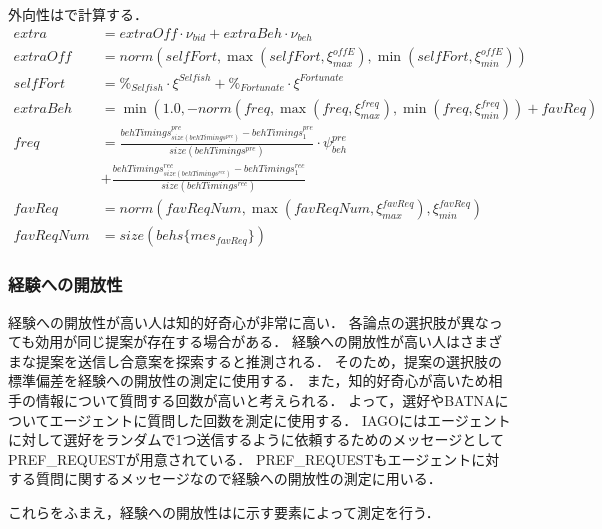 外向性はで計算する．
\begin{align}
    extra &= \mathit{extraOff} \cdot \nu_{\mathit{bid}} + extraBeh \cdot \nu_{beh} \label{eq:extraversion} \\
    \mathit{extraOff} &= norm\left( \mathit{selfFort}, \max \left( \mathit{selfFort}, \xi_{max}^{\mathit{offE}}\right) , \min \left( \mathit{selfFort}, \xi_{min}^{\mathit{offE}}\right) \right) \nonumber \\
    \mathit{selfFort} &= \%_{\mathit{Selfish}} \cdot \xi^{\mathit{Selfish}} + \%_{Fortunate} \cdot \xi^{\mathit{Fortunate}} \nonumber \\
    extraBeh &= \min \left( 1.0, -norm\left( \mathit{freq}, \max \left( \mathit{freq}, \xi_{max}^{\mathit{freq}}\right), \min\left( \mathit{freq}, \xi_{min}^{\mathit{freq}}\right) \right) + \mathit{favReq}\right) \nonumber \\
    \mathit{freq} &= \frac{behTimings^{pre}_{size(behTimings^{pre})} - behTimings^{pre}_1}{size(behTimings^{pre})} \cdot \psi_{\mathit{beh}}^{pre} \nonumber \\
    &+ \frac{behTimings^{rec}_{size(behTimings^{rec})} - behTimings^{rec}_1}{size(behTimings^{rec})} \nonumber \\
    \mathit{favReq} &= norm\left( \mathit{favReqNum}, \max \left( \mathit{favReqNum}, \xi_{max}^{\mathit{favReq}}\right), \xi_{min}^{\mathit{favReq}} \right) \nonumber \\
    \mathit{favReqNum} &= size(behs\{mes_{\mathit{favReq}}\}) \nonumber
\end{align}

\subsubsection{経験への開放性}
経験への開放性が高い人は知的好奇心が非常に高い．
各論点の選択肢が異なっても効用が同じ提案が存在する場合がある．
経験への開放性が高い人はさまざまな提案を送信し合意案を探索すると推測される．
そのため，提案の選択肢の標準偏差を経験への開放性の測定に使用する．
また，知的好奇心が高いため相手の情報について質問する回数が高いと考えられる．
よって，選好やBATNAについてエージェントに質問した回数を測定に使用する．
IAGOにはエージェントに対して選好をランダムで1つ送信するように依頼するためのメッセージとしてPREF\_REQUESTが用意されている．
PREF\_REQUESTもエージェントに対する質問に関するメッセージなので経験への開放性の測定に用いる．

これらをふまえ，経験への開放性はに示す要素によって測定を行う．

